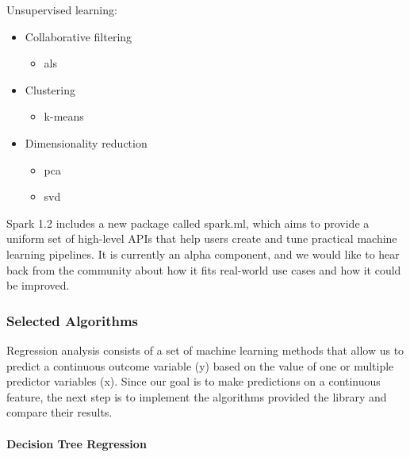 Unsupervised learning:
\begin{itemize}
\item Collaborative filtering
\begin{itemize}
\item \acf{als}
\end{itemize}
\item Clustering
\begin{itemize}
\item k-means
\end{itemize}
\item Dimensionality reduction
\begin{itemize}
\item \acf{pca}
\item \acf{svd}
\end{itemize}
\end{itemize}
Spark 1.2 includes a new package called spark.ml, which aims to provide a uniform set of
high-level APIs that help users create and tune practical machine learning pipelines. It is
currently an alpha component, and we would like to hear back from the community about how it
fits real-world use cases and how it could be improved.
\subsubsection{Selected Algorithms}\label{sec:sparkalgos}
Regression analysis consists of a set of machine learning methods that allow us to predict a
continuous outcome variable (y) based on the value of one or multiple predictor variables (x).
Since our goal is to make predictions on a continuous feature, the next step is to implement the
algorithms provided the library and compare their results.\\\\

\textbf{Decision Tree Regression}\\\\

